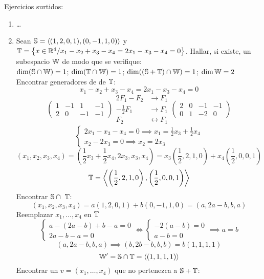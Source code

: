 \documentclass[../practica.root.tex]{subfiles}
\begin{document}
Ejercicios surtidos:
\begin{enumerate}
    \item \dots
    \item Sean $\S = \langle (1,2,0,1),(0,-1,1,0) \rangle$ y $\T = \big\{ x \in \R^4 / x_1 - x_2 + x_3 - x_4 = 2x_1 - x_3 - x_4 = 0 \big\}$. Hallar, si existe, un subespacio $\W$ de modo que se verifique: \\
          $\dim(\S \cap \W) = 1$; $\dim(\T \cap \W) = 1$; $\dim((\S+\T) \cap \W) = 1$; $\dim\W = 2$
          Encontrar generadores de de $\T$:
          \[ x_1 - x_2 + x_3 - x_4 = 2x_1 - x_3 - x_4 = 0 \]
          \[
              \begin{pmatrix}
                  1 & -1 & 1  & -1 \\
                  2 & 0  & -1 & -1
              \end{pmatrix}
              \begin{array}{rl}
                  2F_1 - F_2      & \to F_1             \\
                  -\frac{1}{2}F_1 & \to F_1             \\
                  F_2             & \leftrightarrow F_1
              \end{array}
              \begin{pmatrix}
                  2 & 0 & -1 & -1 \\
                  0 & 1 & -2 & 0
              \end{pmatrix}
          \] \[
              \begin{cases}
                  2x_1 - x_3 - x_4 = 0 \implies x_1 = \frac{1}{2}x_3 + \frac{1}{2}x_4 \\
                  x_2 - 2x_3 = 0 \implies x_2 = 2x_3
              \end{cases}
          \] \[
              (x_1, x_2, x_3, x_4)
              = \left( \frac{1}{2}x_3 + \frac{1}{2}x_4, 2x_3, x_3, x_4 \right)
              = x_3 \left( \frac{1}{2},2,1,0 \right) + x_4 \left( \frac{1}{2},0,0,1 \right)
          \] \[
              \T = \left\langle \left(\frac{1}{2},2,1,0\right),\left(\frac{1}{2},0,0,1\right) \right\rangle
          \]
          Encontrar $\S \cap \T$:
          \[
              (x_1, x_2, x_3, x_4) = a(1,2,0,1) + b(0,-1,1,0) = (a, 2a-b, b, a)
          \]
          Reemplazar $x_1,\dots,x_4$ en $\T$
          \[
              \begin{cases}
                  a - (2a - b) + b - a = 0 \\
                  2a - b - a = 0
              \end{cases}
              \iff
              \begin{cases}
                  -2(a - b) = 0 \\
                  a - b = 0
              \end{cases}
              \implies
              a = b
          \] \[
              (a, 2a-b, b, a) \implies (b, 2b - b, b, b) = b(1, 1, 1, 1)
          \] \[
              \W' = \S \cap \T = \langle (1, 1, 1, 1) \rangle
          \]
          Encontrar un $v = (x_1,\dots,x_4)$ que no pertenezca a $\S + \T$:


\end{enumerate}
\end{document}

